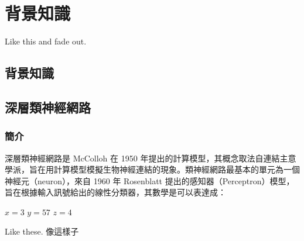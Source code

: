 \chapter{背景知識}
Like this \cite{726791, baevski2020wav2vec} and fade out.

\section{背景知識}

\section{深層類神經網路}

\subsection{簡介}

深層類神經網路是 McColloh 在 1950 年提出的計算模型，其概念取法自連結主意學派，旨在用計算模型模擬生物神經連結的現象。類神經網路最基本的單元為一個神經元（neuron），來自 1960 年 Rosenblatt 提出的感知器（Perceptron）模型，旨在根據輸入訊號給出的線性分類器，其數學是可以表達成：

$ x = 3 $
\( y = 57 \)
\( z = 4 \)

Like these. 像這樣子

